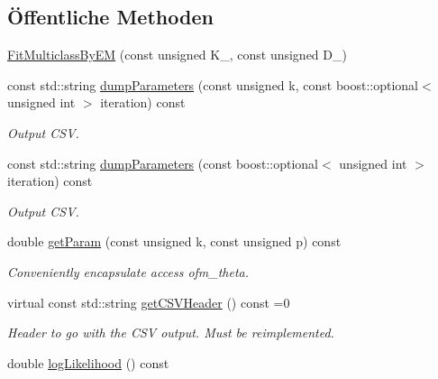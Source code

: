 \subsection*{Öffentliche Methoden}
\begin{DoxyCompactItemize}
\item 
\hyperlink{classCDA_1_1FitMulticlassByEM_a832fd114a95fc194a632eabed92fb4c5}{FitMulticlassByEM} (const unsigned K\_\-, const unsigned D\_)
\item 
const std::string \hyperlink{classCDA_1_1FitMulticlassByEM_aa5598f1ced5c95045f59c99610ab53e5}{dumpParameters} (const unsigned k, const boost::optional$<$ unsigned int $>$ iteration) const 
\begin{DoxyCompactList}\small\item\em Output CSV. \item\end{DoxyCompactList}\item 
const std::string \hyperlink{classCDA_1_1FitMulticlassByEM_abd04a7135250a427a100c95bf2bf43a9}{dumpParameters} (const boost::optional$<$ unsigned int $>$ iteration) const 
\begin{DoxyCompactList}\small\item\em Output CSV. \item\end{DoxyCompactList}\item 
double \hyperlink{classCDA_1_1FitMulticlassByEM_a4185d0f323087ef9112e903a2782fdfd}{getParam} (const unsigned k, const unsigned p) const 
\begin{DoxyCompactList}\small\item\em Conveniently encapsulate access ofm\_\-theta. \item\end{DoxyCompactList}\item 
\hypertarget{classCDA_1_1FitMulticlassByEM_a6d7bf7ba4d3421d5dfef7bffb91d85c7}{
virtual const std::string \hyperlink{classCDA_1_1FitMulticlassByEM_a6d7bf7ba4d3421d5dfef7bffb91d85c7}{getCSVHeader} () const =0}
\label{classCDA_1_1FitMulticlassByEM_a6d7bf7ba4d3421d5dfef7bffb91d85c7}

\begin{DoxyCompactList}\small\item\em Header to go with the CSV output. Must be reimplemented. \item\end{DoxyCompactList}\item 
\hypertarget{classCDA_1_1FitMulticlassByEM_abaea206aef382360246cf2a64dadc74c}{
double \hyperlink{classCDA_1_1FitMulticlassByEM_abaea206aef382360246cf2a64dadc74c}{logLikelihood} () const }
\label{classCDA_1_1FitMulticlassByEM_abaea206aef382360246cf2a64dadc74c}


\end{DoxyCompactItemize}
